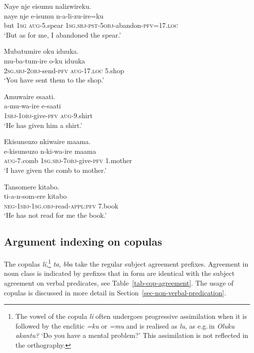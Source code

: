 \ea \label{ex-verb-indexing-obj}
    \begin{xlist}	
\ex	\label{ex-verb-indexing-obj1}
	\glll 	Naye	nje		eisumu 	nalizwireku.\\
	naye	nje		e-isumu 	n-a-li-zu-ire=ku\\
 		but	1\textsc{sg}	\textsc{aug}-5.spear	\textsc{1sg.sbj}-\textsc{pst}-\textsc{5obj}-abandon-\textsc{pfv}=17.\textsc{loc}\\
	\glt  ‘But as for me, I abandoned the spear.’
        
\ex	\label{ex-verb-indexing-obj2}
	\glll 	Mubatumire oku iduuka.\\
	mu-ba-tum-ire o-ku iduuka\\
	2\textsc{sg.sbj}-\textsc{2obj}-send-\textsc{pfv} \textsc{aug}-17.\textsc{loc} 5.shop\\
	\glt ‘You have sent them to the shop.'

\ex	\label{ex-verb-indexing-obj4}
	\glll Amuwaire esaati.\\
	a-mu-wa-ire e-saati\\
	\textsc{1sbj}-\textsc{1obj}-give-\textsc{pfv} \textsc{aug}-9.shirt\\
	\glt ‘He has given him a shirt.'
    
\ex	\label{ex-verb-indexing-obj5}
    	\glll	Ekisunsuzo nkiwaire maama.\\
    	e-kisunsuzo n-ki-wa-ire maama\\
	\textsc{aug}-7.comb \textsc{1sg.sbj}-\textsc{7obj}-give-\textsc{pfv} 1.mother\\
    	\glt ‘I have given the comb to mother.'

\ex	\label{ex-verb-indexing-obj3}
    	\glll Tansomere kitabo.\\
    	ti-a-n-som-ere kitabo\\
	\textsc{neg}-\textsc{1sbj}-\textsc{1sg.obj}-read-\textsc{appl}:\textsc{pfv} 7.book\\
    	\glt ‘He has not read for me the book.'
\end{xlist}	    
\z

\subsection{Argument indexing on copulas}\label{sec-morpho-copulas}
The copulas \textit{li},\footnote{The vowel of the copula \textit{li} often undergoes progressive assimilation when it is followed by the enclitic \textit{=ku} or \textit{=mu} and is realised as \textit{lu}, as e.g.\,in \textit{Oluku akantu?} `Do you have a mental problem?' This assimilation is not reflected in the orthography.}
\textit{ta}, \textit{bba} take the regular subject agreement prefixes. 
Agreement in noun class is indicated by prefixes that in form are identical with the subject agreement on verbal predicates, see Table~\ref{tab-cop-agreement}. 
The usage of copulas is discussed in more detail in Section~\ref{sec-non-verbal-predication}.

